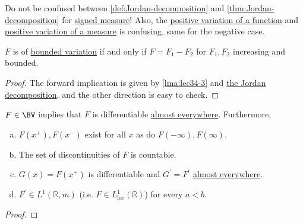\begin{note}
	Do not be confused between \autoref{def:Jordan-decomposition} and \autoref{thm:Jordan-decomposition}
	for \hyperref[def:signed-measure]{signed measure}! Also, the \hyperref[def:positive-variation-function]{positive variation of a function}
	and \hyperref[def:positive-variation-measure]{positive variation of a measure} is confusing, same for the negative case.
\end{note}

\begin{theorem}\label{thm:lec-34}
	\(F\) is of \hyperref[def:bounded-variation]{bounded variation} if and only if \(F = F_1 - F_2\) for \(F_1,F_2\) increasing and bounded.
\end{theorem}
\begin{proof}
	The forward implication is given by \autoref{lma:lec34-3} and \hyperref[def:Jordan-decomposition]{the Jordan decomposition}, and the other
	direction is easy to check.
\end{proof}

\begin{corollary}
	\(F \in\BV\) implies that \(F\) is differentiable \hyperref[def:mu-almost-everywhere]{almost everywhere}. Furthermore,
	\begin{enumerate}[(a)]
		\item \(F(x^+),F(x^-)\) exist for all \(x\) as do \(F(-\infty),F(\infty)\).
		\item The set of discontinuities of \(F\) is countable.
		\item \(G(x) = F(x^+)\) is differentiable and \(G^\prime = F^\prime\) \hyperref[def:mu-almost-everywhere]{almost everywhere}.
		\item \(F^\prime \in L^1(\mathbb{R}, m)\) (i.e. \(F \in L^1_{\operatorname{loc}}(\mathbb{R})\)) for every \(a < b\).
	\end{enumerate}
\end{corollary}
\begin{proof}
\end{proof}